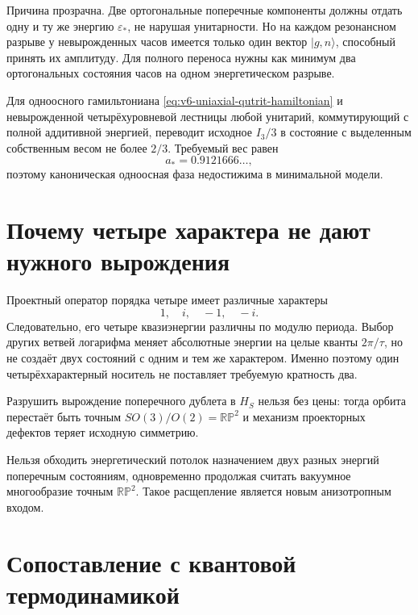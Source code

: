 Причина прозрачна. Две ортогональные поперечные компоненты должны отдать
одну и ту же энергию $\varepsilon_*$, не нарушая унитарности. Но на каждом
резонансном разрыве у невырожденных часов имеется только один вектор
$|g,n\rangle$, способный принять их амплитуду. Для полного переноса нужны
как минимум два ортогональных состояния часов на одном энергетическом
разрыве.

\begin{theorem}
Для одноосного гамильтониана \eqref{eq:v6-uniaxial-qutrit-hamiltonian} и
невырожденной четырёхуровневой лестницы любой унитарий, коммутирующий с
полной аддитивной энергией, переводит исходное $I_3/3$ в состояние с
выделенным собственным весом не более $2/3$. Требуемый вес равен
\begin{equation*}
 a_*=0.9121666\ldots,
\end{equation*}
поэтому каноническая одноосная фаза недостижима в минимальной модели.
\end{theorem}

\section{Почему четыре характера не дают нужного вырождения}

Проектный оператор порядка четыре имеет различные характеры
\begin{equation}
 1,\quad i,\quad-1,\quad-i.
\end{equation}
Следовательно, его четыре квазиэнергии различны по модулю периода. Выбор
других ветвей логарифма меняет абсолютные энергии на целые кванты
$2\pi/\tau$, но не создаёт двух состояний с одним и тем же характером.
Именно поэтому один четырёххарактерный носитель не поставляет требуемую
кратность два.

Разрушить вырождение поперечного дублета в $H_S$ нельзя без цены: тогда
орбита перестаёт быть точным $SO(3)/O(2)=\mathbb{RP}^2$ и механизм
проекторных дефектов теряет исходную симметрию.

\begin{nogocriterion}
Нельзя обходить энергетический потолок назначением двух разных энергий
поперечным состояниям, одновременно продолжая считать вакуумное
многообразие точным $\mathbb{RP}^2$. Такое расщепление является новым
анизотропным входом.
\end{nogocriterion}

\section{Сопоставление с квантовой термодинамикой}

